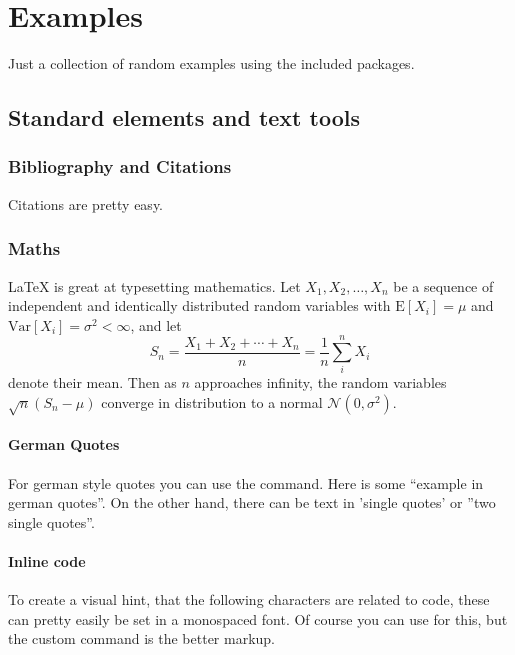 
\chapter{Examples}
Just a collection of random examples using the included packages.

\section{Standard elements and text tools}

\subsection{Bibliography and Citations}
Citations are pretty easy. \cite{AEEE:2016}


\subsection{Maths}
\LaTeX{} is great at typesetting mathematics. Let $X_1, X_2, \ldots, X_n$ be a sequence of independent and identically distributed random variables with $\text{E}[X_i] = \mu$ and $\text{Var}[X_i] = \sigma^2 < \infty$, and let
$$S_n = \frac{X_1 + X_2 + \cdots + X_n}{n}
      = \frac{1}{n}\sum_{i}^{n} X_i$$
denote their mean. Then as $n$ approaches infinity, the random variables $\sqrt{n}(S_n - \mu)$ converge in distribution to a normal $\mathcal{N}(0, \sigma^2)$.



\subsubsection{German Quotes}
For german style quotes you can use the  command.
Here is some \enquote{example in german quotes}.
On the other hand, there can be text in 'single quotes' or ''two single quotes''.


\subsubsection{Inline code}
To create a visual hint, that the following characters are related to code, these can pretty easily be set in a monospaced font.
Of course you can use  for this, but the custom command  is the better markup.


